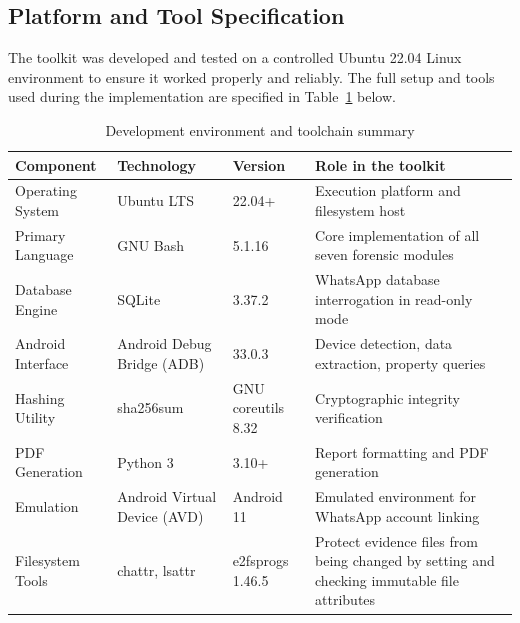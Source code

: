 \documentclass[12pt,a4paper]{report}
\begin{document}
\subsection{Platform and Tool Specification}

The toolkit was developed and tested on a controlled Ubuntu 22.04 Linux environment to ensure it worked properly and reliably. The full setup and tools used during the implementation are specified in Table~\ref{tab:devenv} below.

\begin{table}[h]
    \centering
    \caption{Development environment and toolchain summary}
    \label{tab:devenv}
    \begin{tabular}{p{3cm} p{4cm} p{2.5cm} p{5cm}}
        \toprule
        \textbf{Component} & \textbf{Technology} & \textbf{Version} & \textbf{Role in the toolkit} \\
        \midrule
        Operating System   & Ubuntu LTS                       & 22.04+           & Execution platform and filesystem host \\
        Primary Language   & GNU Bash                         & 5.1.16           & Core implementation of all seven forensic modules \\
        Database Engine    & SQLite                           & 3.37.2           & WhatsApp database interrogation in read-only mode \\
        Android Interface  & Android Debug Bridge (ADB)       & 33.0.3           & Device detection, data extraction, property queries \\
        Hashing Utility    & sha256sum                        & GNU coreutils 8.32 & Cryptographic integrity verification \\
        PDF Generation     & Python 3                         & 3.10+            & Report formatting and PDF generation \\
        Emulation          & Android Virtual Device (AVD)     & Android 11       & Emulated environment for WhatsApp account linking \\
        Filesystem Tools   & chattr, lsattr                   & e2fsprogs 1.46.5 & Protect evidence files from being changed by setting and checking immutable file attributes \\
        \bottomrule
    \end{tabular}
\end{table}
\end{document}
